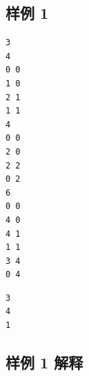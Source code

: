 \subsection{样例 1}

\begin{minipage}{\linewidth}
	\begin{minipage}[t]{0.49\linewidth}
		\begin{lstlisting}[title=\texttt{standard input}]
3
4
0 0
1 0
2 1
1 1
4
0 0
2 0
2 2
0 2
6
0 0
4 0
4 1
1 1
3 4
0 4

\end{lstlisting}
	\end{minipage}
	\begin{minipage}[t]{0.49\linewidth}
		\begin{lstlisting}[title=\texttt{standard output}]
3
4
1
\end{lstlisting}
	\end{minipage}
\end{minipage}

\newpage
\subsection{样例 1 解释}


